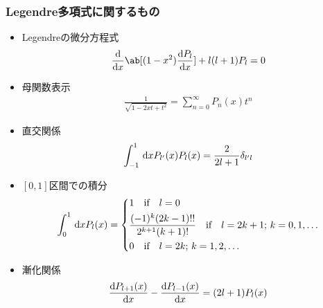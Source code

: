 \subsubsection{Legendre多項式に関するもの}

\begin{itemize}
  \item Legendreの微分方程式
    \begin{gather}%
      \label{eq:legedre_diffeq}
      \diff**{x}{\ab[(1-x^2)\diff{P_l}{x}]} + l(l+1) P_l = 0
    \end{gather}%
  \item 母関数表示
    \begin{gather}%
      \frac{1}{\sqrt{1-2xt+t^2}} = \sum_{n=0}^\infty P_n(x) t^n
    \end{gather}%
  \item 直交関係
    \begin{gather}%
      \label{eq:legendre_orthogonal}
      \int_{-1}^1 \dl{x} P_{l'}(x) P_l(x) = \frac{2}{2l+1} \delta_{l'l}
    \end{gather}%
  \item $[0,1]$区間での積分
    \begin{gather}%
      \int_0^1 \dl{x} P_l(x) =
      \begin{dcases}%
        1 \qqtext{if} l = 0\\
        \frac{(-1)^k(2k-1)!!}{2^{k+1} (k+1)!} \qqtext{if} l = 2k+1;\, k = 0,1,\ldots\\
        0 \qqtext{if} l = 2k;\, k = 1, 2, \ldots
      \end{dcases}%
    \end{gather}%
  \item 漸化関係
    \begin{gather}%
      \label{eq:legedre_zenka1}
      \diff{P_{l+1}(x)}{x} - \diff{P_{l-1}(x)}{x} = (2l+1) P_l(x)
    \end{gather}%
\end{itemize}


